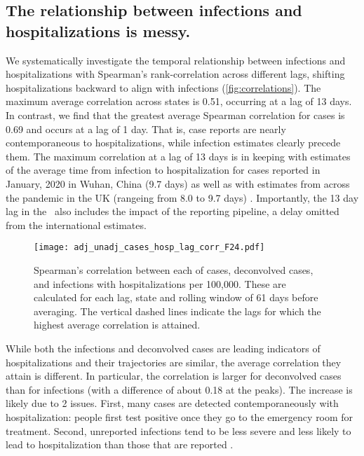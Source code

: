 \subsection{The relationship between infections and hospitalizations is messy.}
\label{sec:lagged-correlations}

We systematically investigate the temporal relationship between infections and
hospitalizations with Spearman's rank-correlation across different lags,
shifting hospitalizations backward to align with infections
(\autoref{fig:correlations}). The maximum average correlation across states is
0.51, occurring at a lag of 13 days. In contrast, we find that the greatest
average Spearman correlation for cases is 0.69 and occurs at a lag of 1 day.
That is, case reports are nearly contemporaneous to hospitalizations, while
infection estimates clearly precede them. The maximum correlation at a lag of 13
days is in keeping with estimates of the average time from infection to
hospitalization for cases reported in January, 2020 in Wuhan, China (9.7 days)
as well as with estimates from across the pandemic in the UK (rangeing from 8.0
to 9.7 days) \citep{ward2021understanding}. Importantly, the 13 day lag in the
\US\ also includes the impact of the reporting pipeline, a delay omitted from
the international estimates. 

\begin{figure}[!tb]
\centering
\texttt{[image: adj\_unadj\_cases\_hosp\_lag\_corr\_F24.pdf]} 
\caption{Spearman's correlation between each of cases, deconvolved cases, and
infections with hospitalizations per 100,000. These are calculated for each lag,
state and rolling window of 61 days before averaging. The vertical dashed lines
indicate the lags for which the highest average correlation is attained.
}
\label{fig:correlations}
\end{figure}
    

While both the infections and deconvolved cases are leading indicators of
hospitalizations and their trajectories are similar, the average correlation
they attain is different. In particular, the correlation is larger for
deconvolved cases than for infections (with a difference of about 0.18 at the
peaks). The increase is likely due to 2 issues. First, many cases are detected
contemporaneously with hospitalization: people first test positive once they go
to the emergency room for treatment. Second, unreported infections tend to be
less severe and less likely to lead to hospitalization than those that are
reported \citep{sallahi2021using}.




